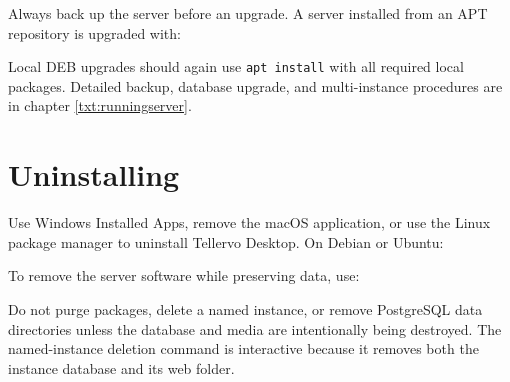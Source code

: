 Always back up the server before an upgrade. A server installed from an APT
repository is upgraded with:


Local DEB upgrades should again use \verb|apt install| with all required local
packages. Detailed backup, database upgrade, and multi-instance procedures are
in chapter \ref{txt:runningserver}.

\section{Uninstalling}

Use Windows Installed Apps, remove the macOS application, or use the Linux
package manager to uninstall Tellervo Desktop. On Debian or Ubuntu:



To remove the server software while preserving data, use:


Do not purge packages, delete a named instance, or remove PostgreSQL data
directories unless the database and media are intentionally being destroyed.
The named-instance deletion command is interactive because it removes both the
instance database and its web folder.
